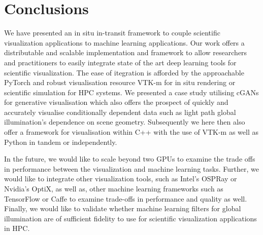 \section{Conclusions}

We have presented an in situ in-transit framework to couple scientific visualization applications to machine learning applications. Our work offers a distributable and scalable implementation and framework to allow researchers and practitioners to easily integrate state of the art deep learning tools for scientific visualization. The ease of itegration is afforded by the approachable PyTorch and robust visualisation resource VTK-m for in situ rendering or scientific simulation for HPC systems. We presented a case study utilising cGANs for generative visualisation which also offers the prospect of quickly and accurately visualise conditionally dependent data such as light path global illumination's dependence on scene geometry. Subsequently we here then also offer a framework for visualisation within C++ with the use of VTK-m as well as Python in tandem or independently. 

In the future, we would like to scale beyond two GPUs to examine the trade offs in performance between the visualization and machine learning tasks. Further, we would like to integrate other visualization tools, such as Intel's OSPRay or Nvidia's OptiX, as well as, other machine learning frameworks such as TensorFlow or Caffe to examine trade-offs in performance and quality as well. Finally, we would like to validate whether machine learning filters for global illumination are of sufficient fidelity to use for scientific visualization applications in HPC.